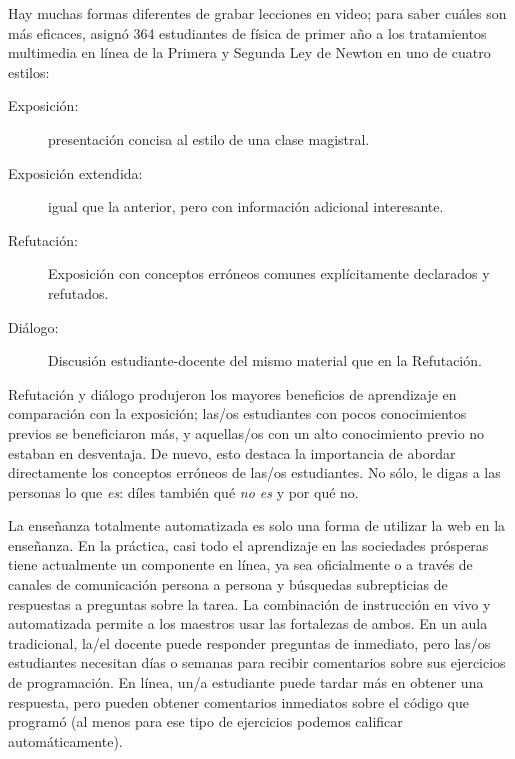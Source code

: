 Hay muchas formas diferentes de grabar lecciones en video;
para saber cuáles son más eficaces,
\cite{Mull2007a} asignó 364 estudiantes de física de primer año
a los tratamientos multimedia en línea de la Primera y Segunda Ley de Newton en uno de cuatro estilos:

\begin{description}

\item[Exposición:]
  presentación concisa al estilo de una clase magistral.

\item[Exposición extendida:]
  igual que la anterior, pero con información adicional interesante.

\item[Refutación:]
  Exposición con conceptos erróneos comunes explícitamente declarados y refutados.

\item[Diálogo:]
  Discusión estudiante-docente del mismo material que en la Refutación.

\end{description}

Refutación y diálogo produjeron los mayores beneficios de aprendizaje en comparación con la exposición;
las/os estudiantes con pocos conocimientos previos se beneficiaron más,
y aquellas/os con un alto conocimiento previo no estaban en desventaja.
De nuevo,
esto destaca la importancia de abordar directamente los conceptos erróneos de las/os estudiantes.
No sólo, le digas a las personas lo que \emph{es}:
díles también qué \emph{no es} y por qué no.


La enseñanza totalmente automatizada es solo una forma de utilizar la web en la enseñanza.
En la práctica,
casi todo el aprendizaje en las sociedades prósperas tiene actualmente un componente en línea,
ya sea oficialmente
o a través de canales de comunicación persona a persona y búsquedas subrepticias de respuestas a preguntas sobre la tarea.
La combinación de instrucción en vivo y automatizada permite a los maestros usar las fortalezas de ambos.
En un aula tradicional,
la/el docente puede responder preguntas de inmediato,
pero las/os estudiantes necesitan días o semanas para recibir comentarios sobre sus ejercicios de programación.
En línea,
un/a estudiante puede tardar más en obtener una respuesta,
pero pueden obtener comentarios inmediatos sobre el código que programó
(al menos para ese tipo de ejercicios podemos calificar automáticamente).

